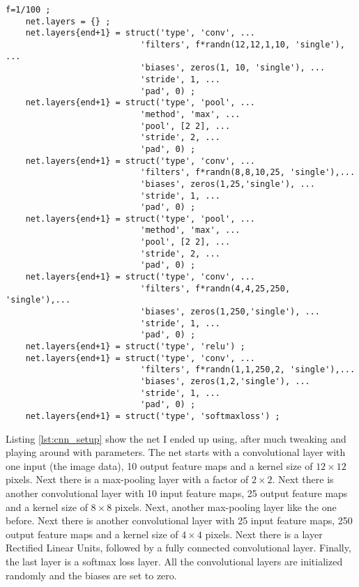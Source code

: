 \documentclass[Main]{subfiles}
\begin{document}
			\newpage
			\begin{lstlisting}[caption=Example of CNN setup, style=Code-Matlab, label=lst:cnn_setup]
	f=1/100 ;
	net.layers = {} ;
	net.layers{end+1} = struct('type', 'conv', ...
	                       'filters', f*randn(12,12,1,10, 'single'), ...
	                       'biases', zeros(1, 10, 'single'), ...
	                       'stride', 1, ...
	                       'pad', 0) ;
	net.layers{end+1} = struct('type', 'pool', ...
	                       'method', 'max', ...
	                       'pool', [2 2], ...
	                       'stride', 2, ...
	                       'pad', 0) ;
	net.layers{end+1} = struct('type', 'conv', ...
	                       'filters', f*randn(8,8,10,25, 'single'),...
	                       'biases', zeros(1,25,'single'), ...
	                       'stride', 1, ...
	                       'pad', 0) ;
	net.layers{end+1} = struct('type', 'pool', ...
	                       'method', 'max', ...
	                       'pool', [2 2], ...
	                       'stride', 2, ...
	                       'pad', 0) ;
	net.layers{end+1} = struct('type', 'conv', ...
	                       'filters', f*randn(4,4,25,250, 'single'),...
	                       'biases', zeros(1,250,'single'), ...
	                       'stride', 1, ...
	                       'pad', 0) ;
	net.layers{end+1} = struct('type', 'relu') ;
	net.layers{end+1} = struct('type', 'conv', ...
	                       'filters', f*randn(1,1,250,2, 'single'),...
	                       'biases', zeros(1,2,'single'), ...
	                       'stride', 1, ...
	                       'pad', 0) ;
	net.layers{end+1} = struct('type', 'softmaxloss') ;

			\end{lstlisting}

			Listing \ref{lst:cnn_setup} show the net I ended up using, after much tweaking and playing around with parameters.
			The net starts with a convolutional layer with one input (the image data), 10 output feature maps and a kernel size of $12\times12$ pixels.
			Next there is a max-pooling layer with a factor of $2\times2$.
			Next there is another convolutional layer with 10 input feature maps, 25 output feature maps and a kernel size of $8\times8$ pixels.
			Next, another max-pooling layer like the one before.
			Next there is another convolutional layer with 25 input feature maps, 250 output feature maps and a kernel size of $4\times4$ pixels.
			Next there is a layer Rectified Linear Units, followed by a fully connected convolutional layer.
			Finally, the last layer is a softmax loss layer.
			All the convolutional layers are initialized randomly and the biases are set to zero.
\end{document}
